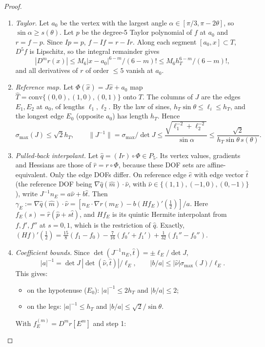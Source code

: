 \documentclass[11pt]{article}
\theoremstyle{remark}\newtheorem{remark}[theorem]{Remark}
\newcommand{\norm}[1]{\|#1\|}\newcommand{\ip}[2]{\langle #1,#2\rangle}\DeclareMathOperator{\curl}{curl}\DeclareMathOperator{\diam}{diam}
\begin{document}
\begin{proof}
\begin{enumerate}[label=\arabic*.]
\item \emph{Taylor.} Let $a_0$ be the vertex with the largest angle $\alpha\in[\pi/3,\pi-2\theta]$, so
$\sin\alpha\ge s(\theta)$. Let $p$ be the degree-5 Taylor polynomial of $f$ at $a_0$ and $r=f-p$. Since $Ip=p$,
$f-If=r-Ir$. Along each segment $[a_0,x]\subset T$, $D^5f$ is Lipschitz, so the integral remainder gives
\[|D^mr(x)|\le M_6|x-a_0|^{6-m}/(6-m)!\le M_6h_T^{6-m}/(6-m)!,\]
and all derivatives of $r$ of order $\le5$ vanish at $a_0$.
\item \emph{Reference map.} Let $\Phi(\hat x)=J\hat x+a_0$ map $\hat T=\mathrm{conv}\{(0,0),(1,0),(0,1)\}$ onto $T$. The columns
of $J$ are the edges $E_1,E_2$ at $a_0$, of lengths $\ell_1,\ell_2$. By the law of sines,
$h_T\sin\theta\le\ell_i\le h_T$, and the longest edge $E_0$ (opposite $a_0$) has length $h_T$. Hence
\[\sigma_{\max}(J)\le\sqrt2h_T,\qquad \norm{J^{-1}}=\sigma_{\max}/\det J\le\frac{\sqrt{\ell_1^{-2}+\ell_2^{-2}}}{\sin\alpha}\le\frac{\sqrt2}{h_T\sin\theta\,s(\theta)} .\]
\item \emph{Pulled-back interpolant.} Let $\hat q=(Ir)\circ\Phi\in P_5$. Its vertex values, gradients and Hessians are those of
$\hat r=r\circ\Phi$, because these DOF sets are affine-equivalent. Only the edge DOFs differ. On reference edge $\hat e$ with
edge vector $\hat t$ (the reference DOF being $\nabla\hat q(\hat m)\cdot\hat\nu$, with
$\hat\nu\in\{(1,1),(-1,0),(0,-1)\}$), write $J^{-1}n_E=a\hat\nu+b\hat t$. Then
$\gamma_E:=\nabla\hat q(\hat m)\cdot\hat\nu=[n_E\cdot\nabla r(m_E)-b(Hf_E)'(\tfrac12)]/a$. Here $f_E(s)=\hat r(\hat p+s\hat t)$, and
$Hf_E$ is its quintic Hermite interpolant from $f,f',f''$ at $s=0,1$, which is the restriction of $\hat q$. Exactly,
$(Hf)'(\tfrac12)=\tfrac{15}8(f_1-f_0)-\tfrac7{16}(f_0'+f_1')+\tfrac1{32}(f_1''-f_0'')$.
\item \emph{Coefficient bounds.} Since $\det(J^{-1}n_E,\hat t)=\pm\ell_E/\det J$,
\[|a|^{-1}=\det J\,|\det(\hat\nu,\hat t)|/\ell_E,\qquad |b/a|\le|\hat\nu|\sigma_{\max}(J)/\ell_E .\]
This gives:
\begin{itemize}
\item on the hypotenuse ($E_0$): $|a|^{-1}\le2h_T$ and $|b/a|\le2$;
\item on the legs: $|a|^{-1}\le h_T$ and $|b/a|\le\sqrt2/\sin\theta$.
\end{itemize}
With $f_E^{(m)}=D^mr[E^m]$ and step 1:
\begin{itemize}

\end{itemize}
\end{enumerate}
\end{proof}
\end{document}
